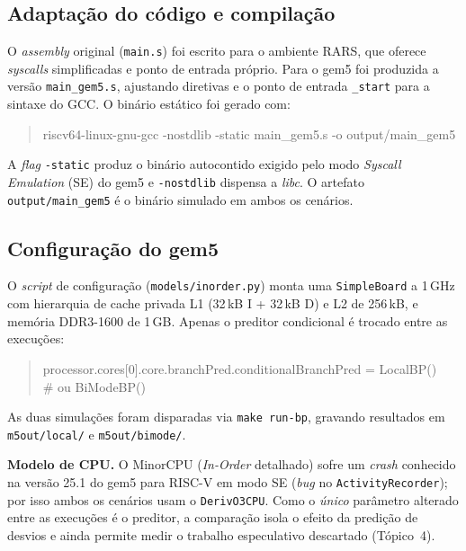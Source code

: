 \documentclass[12pt]{article}
\begin{document}
\subsection{Adaptação do código e compilação}

O \emph{assembly} original (\texttt{main.s}) foi escrito para o ambiente
RARS, que oferece \emph{syscalls} simplificadas e ponto de entrada
próprio. Para o gem5 foi produzida a versão \texttt{main\_gem5.s},
ajustando diretivas e o ponto de entrada \texttt{\_start} para a sintaxe
do GCC. O binário estático foi gerado com:

\begin{quote}\small\ttfamily
riscv64-linux-gnu-gcc -nostdlib -static main\_gem5.s -o output/main\_gem5
\end{quote}

A \emph{flag} \texttt{-static} produz o binário autocontido exigido pelo
modo \emph{Syscall Emulation} (SE) do gem5 e \texttt{-nostdlib} dispensa a
\emph{libc}. O artefato \texttt{output/main\_gem5} é o binário simulado em
ambos os cenários.

\subsection{Configuração do gem5}

O \emph{script} de configuração (\texttt{models/inorder.py}) monta uma
\texttt{SimpleBoard} a 1\,GHz com hierarquia de cache privada
L1 (32\,kB I + 32\,kB D) e L2 de 256\,kB, e memória DDR3-1600 de 1\,GB.
Apenas o preditor condicional é trocado entre as execuções:

\begin{quote}\small\ttfamily
processor.cores[0].core.branchPred.conditionalBranchPred = LocalBP()\\
\# ou BiModeBP()
\end{quote}

As duas simulações foram disparadas via \texttt{make run-bp}, gravando
resultados em \texttt{m5out/local/} e \texttt{m5out/bimode/}.

\noindent\textbf{Modelo de CPU.} O MinorCPU (\emph{In-Order} detalhado)
sofre um \emph{crash} conhecido na versão 25.1 do gem5 para RISC-V em modo
SE (\emph{bug} no \texttt{ActivityRecorder}); por isso ambos os cenários
usam o \texttt{DerivO3CPU}. Como o \emph{único} parâmetro alterado entre as
execuções é o preditor, a comparação isola o efeito da predição de desvios
e ainda permite medir o trabalho especulativo descartado (Tópico~4).
\end{document}
